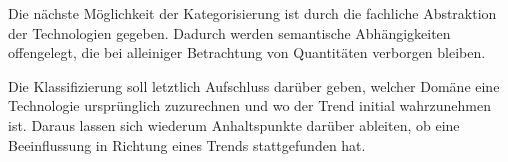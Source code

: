 Die nächste Möglichkeit der Kategorisierung ist durch die fachliche Abstraktion der Technologien gegeben. Dadurch werden semantische Abhängigkeiten offengelegt, die bei alleiniger Betrachtung von Quantitäten verborgen bleiben.

Die Klassifizierung soll letztlich Aufschluss darüber geben, welcher Domäne eine Technologie ursprünglich zuzurechnen und wo der Trend initial wahrzunehmen ist. Daraus lassen sich wiederum Anhaltspunkte darüber ableiten, ob eine Beeinflussung in Richtung eines Trends stattgefunden hat.